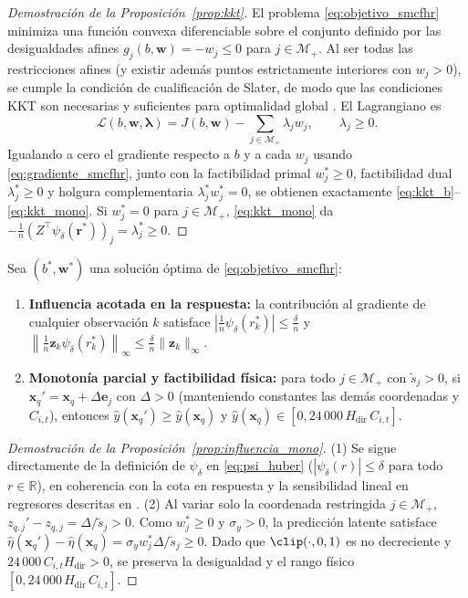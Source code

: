 \begin{proof}[Demostración de la Proposición~\ref{prop:kkt}]
El problema \eqref{eq:objetivo_smcfhr} minimiza una función convexa diferenciable sobre el conjunto definido por las desigualdades afines $g_j(b, \mathbf{w}) = -w_j \le 0$ para $j \in \mathcal{M}_+$. Al ser todas las restricciones afines (y existir además puntos estrictamente interiores con $w_j > 0$), se cumple la condición de cualificación de Slater, de modo que las condiciones KKT son necesarias y suficientes para optimalidad global \cite{boyd2004convex}. El Lagrangiano es
\[
\mathcal{L}(b, \mathbf{w}, \boldsymbol{\lambda}) = J(b, \mathbf{w}) - \sum_{j \in \mathcal{M}_+} \lambda_j w_j, \qquad \lambda_j \ge 0.
\]
Igualando a cero el gradiente respecto a $b$ y a cada $w_j$ usando \eqref{eq:gradiente_smcfhr}, junto con la factibilidad primal $w_j^* \ge 0$, factibilidad dual $\lambda_j^* \ge 0$ y holgura complementaria $\lambda_j^* w_j^* = 0$, se obtienen exactamente \eqref{eq:kkt_b}--\eqref{eq:kkt_mono}. Si $w_j^* = 0$ para $j \in \mathcal{M}_+$, \eqref{eq:kkt_mono} da $-\frac{1}{n}(Z^\top \psi_\delta(\mathbf{r}^*))_j = \lambda_j^* \ge 0$.
\end{proof}

\begin{proposition}\label{prop:influencia_mono}
Sea $(b^*, \mathbf{w}^*)$ una solución óptima de \eqref{eq:objetivo_smcfhr}:
\begin{enumerate}
    \item \textbf{Influencia acotada en la respuesta:} la contribución al gradiente de cualquier observación $k$ satisface $\left|\frac{1}{n}\psi_\delta(r_k^*)\right| \le \frac{\delta}{n}$ y $\left\|\frac{1}{n}\mathbf{z}_k \psi_\delta(r_k^*)\right\|_\infty \le \frac{\delta}{n}\|\mathbf{z}_k\|_\infty$.
    \item \textbf{Monotonía parcial y factibilidad física:} para todo $j \in \mathcal{M}_+$ con $\tilde{s}_j > 0$, si $\mathbf{x}_q' = \mathbf{x}_q + \Delta \mathbf{e}_j$ con $\Delta > 0$ (manteniendo constantes las demás coordenadas y $C_{i,t}$), entonces $\hat{y}(\mathbf{x}_q') \ge \hat{y}(\mathbf{x}_q)$ y $\hat{y}(\mathbf{x}_q) \in [0, 24\,000\,H_{\mathrm{dir}}\,C_{i,t}]$.
\end{enumerate}
\end{proposition}
\begin{proof}[Demostración de la Proposición~\ref{prop:influencia_mono}]
(1) Se sigue directamente de la definición de $\psi_\delta$ en \eqref{eq:psi_huber} ($|\psi_\delta(r)| \le \delta$ para todo $r \in \mathbb{R}$), en coherencia con la cota en respuesta y la sensibilidad lineal en regresores descritas en \cite{huber1964,hampel1986robust,huber2009robust}. (2) Al variar solo la coordenada restringida $j \in \mathcal{M}_+$, $z_{q,j}' - z_{q,j} = \Delta / \tilde{s}_j > 0$. Como $w_j^* \ge 0$ y $\sigma_y > 0$, la predicción latente satisface $\hat{\eta}(\mathbf{x}_q') - \hat{\eta}(\mathbf{x}_q) = \sigma_y w_j^* \Delta / \tilde{s}_j \ge 0$. Dado que $\clip(\cdot, 0, 1)$ es no decreciente y $24\,000\,C_{i,t} H_{\mathrm{dir}} > 0$, se preserva la desigualdad y el rango físico $[0, 24\,000\,H_{\mathrm{dir}}\,C_{i,t}]$.
\end{proof}
